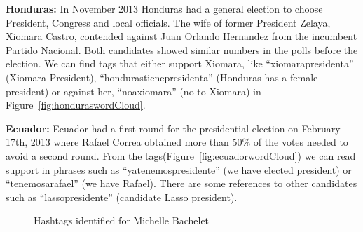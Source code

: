 \noindent
{\bf Honduras:}
In November 2013 Honduras had a general election to choose President, Congress and local officials. 
The wife of former President Zelaya, Xiomara Castro, contended against Juan Orlando Hernandez from the incumbent Partido Nacional. 
Both candidates showed similar numbers in the polls before the election. 
We can find tags that either support Xiomara, like “xiomarapresidenta” (Xiomara President), “hondurastienepresidenta” (Honduras has a female president) or against her, “noaxiomara” (no to Xiomara) in Figure~\ref{fig:honduraswordCloud}.

\noindent
{\bf Ecuador:}
Ecuador had a first round for the presidential election on February 17th, 2013 where Rafael Correa obtained more than 50\% of the votes needed to avoid a second round. 
From the tags(Figure~\ref{fig:ecuadorwordCloud}) we can read support in phrases such as “yatenemospresidente” (we have elected president) or “tenemosarafael” (we have Rafael). 
There are some references to other candidates such as “lassopresidente” (candidate Lasso president).

\begin{figure}
	\centering
	\caption{Hashtags identified for Michelle Bachelet} 
	\label{fig:bacheletwordCloud}
\end{figure}

